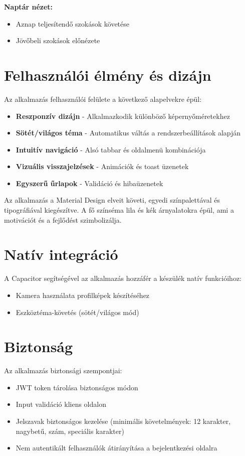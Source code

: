 \documentclass[12pt]{report}
\begin{document}
\textbf{Naptár nézet:}
\begin{itemize}
  \item Aznap teljesítendő szokások követése
  \item Jövőbeli szokások előnézete
\end{itemize}

\section{Felhasználói élmény és dizájn}
Az alkalmazás felhasználói felülete a következő alapelvekre épül:
\begin{itemize}
  \item \textbf{Reszponzív dizájn} - Alkalmazkodik különböző képernyőméretekhez
  \item \textbf{Sötét/világos téma} - Automatikus váltás a rendszerbeállítások alapján
  \item \textbf{Intuitív navigáció} - Alsó tabbar és oldalmenü kombinációja
  \item \textbf{Vizuális visszajelzések} - Animációk és toast üzenetek
  \item \textbf{Egyszerű űrlapok} - Validáció és hibaüzenetek
\end{itemize}

Az alkalmazás a Material Design elveit követi, egyedi színpalettával és tipográfiával kiegészítve. A fő színséma lila és kék árnyalatokra épül, ami a motivációt és a fejlődést szimbolizálja.


\section{Natív integráció}
A Capacitor segítségével az alkalmazás hozzáfér a készülék natív funkcióihoz:
\begin{itemize}
  \item Kamera használata profilképek készítéséhez
  \item Eszköztéma-követés (sötét/világos mód)
\end{itemize}

\section{Biztonság}
Az alkalmazás biztonsági szempontjai:
\begin{itemize}
  \item JWT token tárolása biztonságos módon
  \item Input validáció kliens oldalon
  \item Jelszavak biztonságos kezelése (minimális követelmények: 12 karakter, nagybetű, szám, speciális karakter)
  \item Nem autentikált felhasználók átirányítása a bejelentkezési oldalra
\end{itemize}
\end{document}
